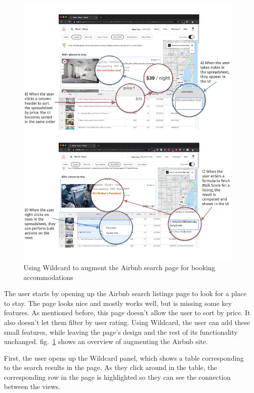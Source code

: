 \documentclass[english,submission]{programming}
\begin{document}
\begin{figure}
\hypertarget{fig:airbnb-demo}{%
\centering
\includegraphics{media/airbnb-demo-300dpi.png}
\caption{Using Wildcard to augment the Airbnb search page for booking
accommodations}\label{fig:airbnb-demo}
}
\end{figure}

The user starts by opening up the Airbnb search listings page to look
for a place to stay. The page looks nice and mostly works well, but is
missing some key features. As mentioned before, this page doesn't allow
the user to sort by price. It also doesn't let them filter by user
rating. Using Wildcard, the user can add these small features, while
leaving the page's design and the rest of its functionality unchanged.{
fig.~\ref{fig:airbnb-demo} shows an overview of augmenting the Airbnb
site.}

First, the user opens up the Wildcard panel, which shows a table
corresponding to the search results in the page. As they click around in
the table, the corresponding row in the page is highlighted so they can
see the connection between the views.
\end{document}
